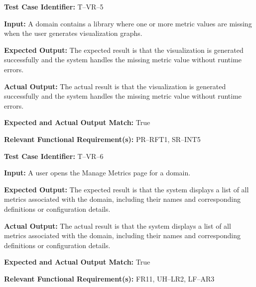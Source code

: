 \documentclass[12pt, titlepage]{article}
\begin{document}
\begin{mdframed}[linewidth=0.5mm]
\setlength{\parindent}{0pt}
\textbf{Test Case Identifier:} T--VR--5
\vspace{0.4em}

\textbf{Input:} A domain contains a library where one or more metric values are missing when the user generates visualization graphs.
\vspace{0.4em}

\textbf{Expected Output:} The expected result is that the visualization is generated successfully and the system handles the missing metric value without runtime errors.
\vspace{0.4em}

\textbf{Actual Output:} The actual result is that the visualization is generated successfully and the system handles the missing metric value without runtime errors.
\vspace{0.4em}

\textbf{Expected and Actual Output Match:} True
\vspace{0.4em}

\textbf{Relevant Functional Requirement(s):} PR--RFT1, SR--INT5
\end{mdframed}

\begin{mdframed}[linewidth=0.5mm]
\setlength{\parindent}{0pt}
\textbf{Test Case Identifier:} T--VR--6
\vspace{0.4em}

\textbf{Input:} A user opens the Manage Metrics page for a domain.
\vspace{0.4em}

\textbf{Expected Output:} The expected result is that the system displays a list of all metrics associated with the domain, including their names and corresponding definitions or configuration details.
\vspace{0.4em}

\textbf{Actual Output:} The actual result is that the system displays a list of all metrics associated with the domain, including their names and corresponding definitions or configuration details.
\vspace{0.4em}

\textbf{Expected and Actual Output Match:} True
\vspace{0.4em}

\textbf{Relevant Functional Requirement(s):} FR11, UH--LR2, LF--AR3
\end{mdframed}
\end{document}
